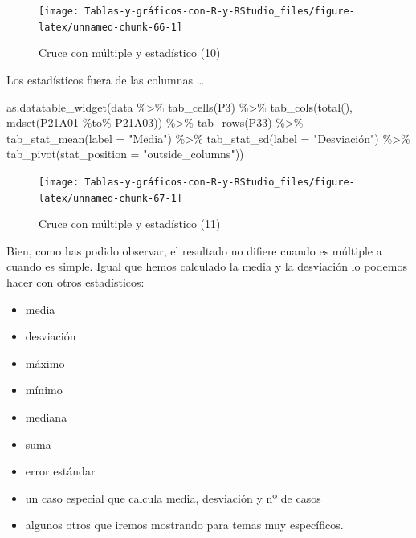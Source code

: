 \documentclass[
]{book}
\newenvironment{Shaded}{\begin{snugshade}}{\end{snugshade}}
\newcommand{\AttributeTok}[1]{\textcolor[rgb]{0.77,0.63,0.00}{#1}}
\newcommand{\FunctionTok}[1]{\textcolor[rgb]{0.00,0.00,0.00}{#1}}
\newcommand{\NormalTok}[1]{#1}
\newcommand{\SpecialCharTok}[1]{\textcolor[rgb]{0.00,0.00,0.00}{#1}}
\newcommand{\StringTok}[1]{\textcolor[rgb]{0.31,0.60,0.02}{#1}}
\providecommand{\tightlist}{%
  \setlength{\itemsep}{0pt}\setlength{\parskip}{0pt}}
\begin{document}
\begin{figure}[H]

{\centering \texttt{[image: Tablas-y-gráficos-con-R-y-RStudio\_files/figure-latex/unnamed-chunk-66-1]} 

}

\caption{Cruce con múltiple y estadístico (10)}\label{fig:unnamed-chunk-66}
\end{figure}

Los estadísticos fuera de las columnas \ldots{}

\begin{Shaded}
\begin{Highlighting}[]
\FunctionTok{as.datatable\_widget}\NormalTok{(data }\SpecialCharTok{\%\textgreater{}\%} \FunctionTok{tab\_cells}\NormalTok{(P3) }\SpecialCharTok{\%\textgreater{}\%} \FunctionTok{tab\_cols}\NormalTok{(}\FunctionTok{total}\NormalTok{(), }
  \FunctionTok{mdset}\NormalTok{(P21A01 }\SpecialCharTok{\%to\%}\NormalTok{ P21A03)) }\SpecialCharTok{\%\textgreater{}\%} \FunctionTok{tab\_rows}\NormalTok{(P33) }\SpecialCharTok{\%\textgreater{}\%} \FunctionTok{tab\_stat\_mean}\NormalTok{(}\AttributeTok{label =} \StringTok{"Media"}\NormalTok{) }\SpecialCharTok{\%\textgreater{}\%} 
  \FunctionTok{tab\_stat\_sd}\NormalTok{(}\AttributeTok{label =} \StringTok{"Desviación"}\NormalTok{) }\SpecialCharTok{\%\textgreater{}\%} \FunctionTok{tab\_pivot}\NormalTok{(}\AttributeTok{stat\_position =} \StringTok{"outside\_columns"}\NormalTok{))}
\end{Highlighting}
\end{Shaded}

\begin{figure}[H]

{\centering \texttt{[image: Tablas-y-gráficos-con-R-y-RStudio\_files/figure-latex/unnamed-chunk-67-1]} 

}

\caption{Cruce con múltiple y estadístico (11)}\label{fig:unnamed-chunk-67}
\end{figure}

Bien, como has podido observar, el resultado no difiere cuando es múltiple a cuando es simple. Igual que hemos calculado la media y la desviación lo podemos hacer con otros estadísticos:

\begin{itemize}
\tightlist
\item
  media
\item
  desviación
\item
  máximo
\item
  mínimo
\item
  mediana
\item
  suma
\item
  error estándar
\item
  un caso especial que calcula media, desviación y nº de casos
\item
  algunos otros que iremos mostrando para temas muy específicos.
\end{itemize}
\end{document}
